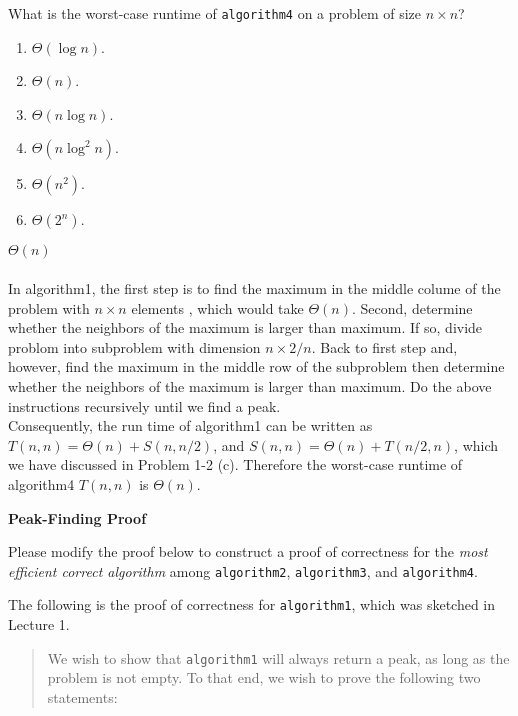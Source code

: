 \documentclass[12pt,twoside]{article}
\begin{document}
\begin{problems}
\begin{problemparts}
\fi

\problempart {} What is the worst-case runtime of \texttt{algorithm4} on a problem of size $n \times n$?
\begin{enumerate}
\item $\Theta(\log n)$.
\item $\Theta(n)$.
\item $\Theta(n \log n)$.
\item $\Theta(n \log^2 n)$.
\item $\Theta(n^2)$.
\item $\Theta(2^n)$.
\end{enumerate}

\ifsolution \solution{}
{\color{blue}$\Theta(n)$
\\
\\
In algorithm1, the first step is to find the maximum in the middle colume of the problem with $n\times n$ elements , 
which would take $\Theta(n)$. Second, determine whether the neighbors of the maximum is larger than maximum. If so, 
divide problom into subproblem with dimension $n\times2/n$. Back to first step and, however, find the maximum in the 
middle row of the subproblem then determine whether the neighbors of the maximum is larger than maximum. Do the above 
instructions recursively until we find a peak.
\\
Consequently, the run time of algorithm1 can be written as $T(n, n) = \Theta(n) + S(n,n/2)$, and $S(n, n) = \Theta(n) + T(n/2,n)$,
 which we have discussed in Problem 1-2 (c). Therefore the worst-case runtime of algorithm4 $T(n,n)$ is $\Theta(n)$.}
\\
\fi

\end{problemparts}

\problem {} \textbf{Peak-Finding Proof}

Please modify the proof below to construct a proof of correctness
for the \emph{most efficient correct algorithm}
among \texttt{algorithm2}, \texttt{algorithm3}, and \texttt{algorithm4}.

The following is the proof of correctness
for \texttt{algorithm1},
which was sketched in Lecture 1.

\begin{quote}
We wish to show that \texttt{algorithm1}
will always return a peak,
as long as the problem is not empty.
To that end,
we wish to prove the following two statements:


\end{quote}
\end{problems}
\end{document}
